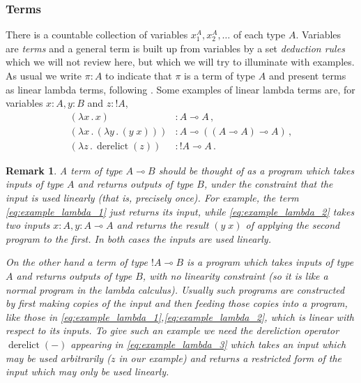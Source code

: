 \documentclass[english,letter paper,12pt,leqno]{article}
\theoremstyle{example}
\newtheorem{remark}[theorem]{Remark}
\numberwithin{equation}{section}
\begin{document}
\subsubsection{Terms}

There is a countable collection of variables $x_1^A,x_2^A,\ldots$ of each type $A$. Variables are \emph{terms} and a general term is built up from variables by a set \emph{deduction rules} which we will not review here, but which we will try to illuminate with examples. As usual we write $\pi: A$ to indicate that $\pi$ is a term of type $A$ and present terms as linear lambda terms, following \cite{benton_etal}. Some examples of linear lambda terms are, for variables $x:A,y:B$ and $z:{!} A$,
\begin{align}
(\lambda x \,.\, x) &: A \multimap A\,, \label{eq:example_lambda_1}\\
(\lambda x \,.\, (\lambda y \,.\, (y \; x))) &: A \multimap ((A \multimap A) \multimap A)\,,\label{eq:example_lambda_2}\\
(\lambda z \,.\, \operatorname{derelict}(z)) &: {!} A \multimap A\,. \label{eq:example_lambda_3}
\end{align} 

\begin{remark}\label{remark:atu} A term of type $A \multimap B$ should be thought of as a program which takes inputs of type $A$ and returns outputs of type $B$, under the constraint that the input is used \emph{linearly} (that is, precisely once). For example, the term \eqref{eq:example_lambda_1} just returns its input, while \eqref{eq:example_lambda_2} takes two inputs $x:A, y:A \multimap A$ and returns the result $(y \; x)$ of applying the second program to the first. In both cases the inputs are used linearly.

On the other hand a term of type ${!} A \multimap B$ is a program which takes inputs of type $A$ and returns outputs of type $B$, with no linearity constraint (so it is like a normal program in the lambda calculus). Usually such programs are constructed by first making copies of the input and then feeding those copies into a program, like those in \eqref{eq:example_lambda_1},\eqref{eq:example_lambda_2}, which is linear with respect to its inputs. To give such an example we need the \emph{dereliction} operator $\operatorname{derelict}(-)$ appearing in \eqref{eq:example_lambda_3} which takes an input which may be used arbitrarily ($z$ in our example) and returns a restricted form of the input which may only be used linearly.
\end{remark}
\end{document}
